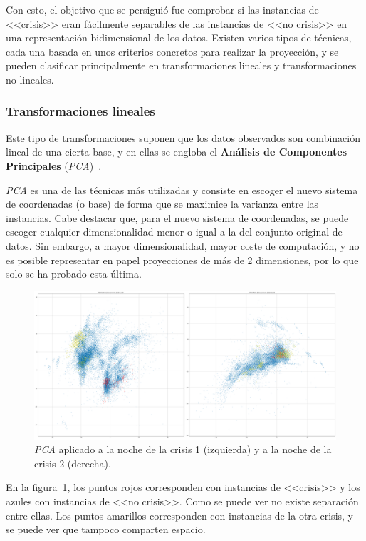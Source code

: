 Con esto, el objetivo que se persiguió fue comprobar si las instancias de <<crisis>> eran fácilmente separables de las instancias de <<no crisis>> en una representación bidimensional de los datos. Existen varios tipos de técnicas, cada una basada en unos criterios concretos para realizar la proyección, y se pueden clasificar principalmente en transformaciones lineales y transformaciones no lineales.  

\subsubsection{Transformaciones lineales}

Este tipo de transformaciones suponen que los datos observados son combinación lineal de una cierta base, y en ellas se engloba el \textbf{Análisis de Componentes Principales} (\textit{PCA})~\cite{pca}. 

\textit{PCA} es una de las técnicas más utilizadas y consiste en escoger el nuevo sistema de coordenadas (o base) de forma que se maximice la varianza entre las instancias. Cabe destacar que, para el nuevo sistema de coordenadas, se puede escoger cualquier dimensionalidad menor o igual a la del conjunto original de datos. Sin embargo, a mayor dimensionalidad, mayor coste de computación, y no es posible representar en papel proyecciones de más de 2 dimensiones, por lo que solo se ha probado esta última. 

\begin{figure}[H]
	\centering
	\includegraphics[width=1\textwidth]{../img/pca.png}
	\caption[Ejemplo de \textit{PCA}.] {\textit{PCA} aplicado a la noche de la crisis 1 (izquierda) y a la noche de la crisis 2 (derecha).}
	\label{fig:pca}
\end{figure}

En la figura~\ref{fig:pca}, los puntos rojos corresponden con instancias de <<crisis>> y los azules con instancias de <<no crisis>>. Como se puede ver no existe separación entre ellas. Los puntos amarillos corresponden con instancias de la otra crisis, y se puede ver que tampoco comparten espacio. 

